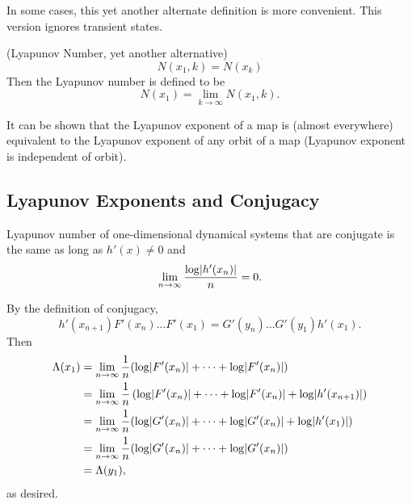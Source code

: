 \documentclass[11pt]{article}
\begin{document}
In some cases, this yet another alternate definition is more convenient.
This version ignores transient states.
\begin{definition}
  (Lyapunov Number, yet another alternative)
  \begin{equation*}
    N(x_1, k) = N(x_k)
  \end{equation*}
  Then the Lyapunov number is defined to be
  \begin{equation*}
    N(x_1) = \lim\limits_{k \to \infty} N(x_1,k).
  \end{equation*}
\end{definition}

It can be shown that the Lyapunov exponent of a map is (almost everywhere) equivalent to the Lyapunov exponent of any orbit of a map (Lyapunov exponent is independent of orbit).


\subsection{Lyapunov Exponents and Conjugacy}
Lyapunov number of one-dimensional dynamical systems that are conjugate is the same
as long as $h'(x) \neq 0$ and
\begin{equation*}
  \lim\limits_{n\to \infty} \frac{\log\lvert h'(x_n)\rvert}{n} = 0.
\end{equation*}

By the definition of conjugacy,
\begin{equation*}
  h'(x_{n+1})F'(x_n)\ldots F'(x_1) = G'(y_n)\ldots G'(y_1)h'(x_1).
\end{equation*}
Then 
\begin{align*}
  \Lambda(x_1) &= \lim\limits_{n\to \infty} \frac{1}{n}\paren{\log\abs{F'(x_n)} + \cdots + \log\abs{F'(x_n)} } \\
  &= \lim\limits_{n\to \infty} \frac{1}{n}\left(\log\abs{F'(x_n)} + \cdots + \log\abs{F'(x_n)} + \log\abs{h'(x_{n+1})}\right) \\
  &= \lim\limits_{n\to \infty} \frac{1}{n} \paren*{ \log\abs{G'(x_n)} + \cdots + \log\abs{G'(x_n)} + \log\abs{h'(x_1)} } \\
  &= \lim\limits_{n\to \infty} \frac{1}{n} \paren*{ \log\abs{G'(x_n)} + \cdots + \log\abs{G'(x_n)} } \\
  &= \Lambda(y_1),
\end{align*} 
as desired.



\end{document}
